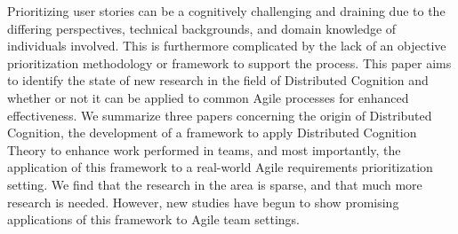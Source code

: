 Prioritizing user stories can be a cognitively challenging and draining due to the differing perspectives, technical backgrounds, and domain knowledge of individuals involved. This is furthermore complicated by the lack of an objective prioritization methodology or framework to support the process. This paper aims to identify the state of new research in the field of Distributed Cognition and whether or not it can be applied to common Agile processes for enhanced effectiveness. We summarize three papers concerning the origin of Distributed Cognition, the development of a framework to apply Distributed Cognition Theory to enhance work performed in teams, and most importantly, the application of this framework to a real-world Agile requirements prioritization setting. We find that the research in the area is sparse, and that much more research is needed. However, new studies have begun to show promising applications of this framework to Agile team settings.
